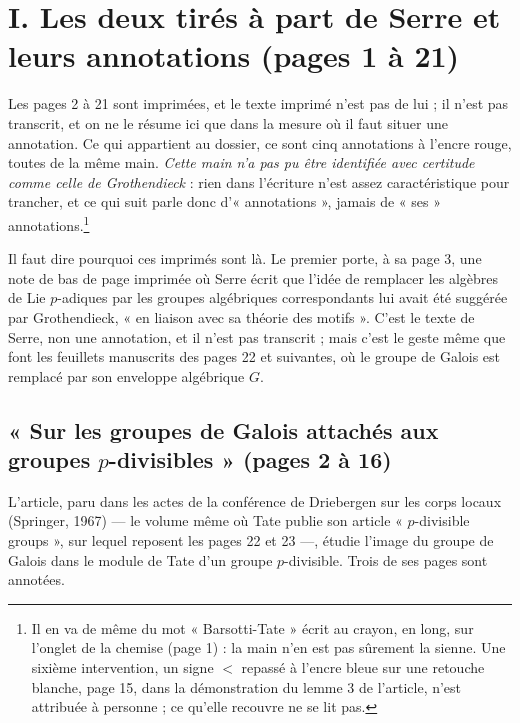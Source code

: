 \documentclass[11pt,a4paper]{article}
\begin{document}
\section*{I. Les deux tirés à part de Serre et leurs annotations (pages 1 à 21)}

Les pages 2 à 21 sont imprimées, et le texte imprimé n'est pas de lui ; il
n'est pas transcrit, et on ne le résume ici que dans la mesure où il faut
situer une annotation. Ce qui appartient au dossier, ce sont cinq annotations
à l'encre rouge, toutes de la même main. \emph{Cette main n'a pas pu être
identifiée avec certitude comme celle de Grothendieck} : rien dans l'écriture
n'est assez caractéristique pour trancher, et ce qui suit parle donc
d'« annotations », jamais de « ses » annotations.\footnote{Il en va de même du
mot « Barsotti-Tate » écrit au crayon, en long, sur l'onglet de la chemise
(page 1) : la main n'en est pas sûrement la sienne. Une sixième intervention,
un signe $<$ repassé à l'encre bleue sur une retouche blanche, page 15, dans
la démonstration du lemme 3 de l'article, n'est attribuée à personne ; ce
qu'elle recouvre ne se lit pas.}

Il faut dire pourquoi ces imprimés sont là. Le premier porte, à sa page 3, une
note de bas de page imprimée où Serre écrit que l'idée de remplacer les
algèbres de Lie $p$-adiques par les groupes algébriques correspondants lui
avait été suggérée par Grothendieck, « en liaison avec sa théorie des
motifs ». C'est le texte de Serre, non une annotation, et il n'est pas
transcrit ; mais c'est le geste même que font les feuillets manuscrits des
pages 22 et suivantes, où le groupe de Galois est remplacé par son enveloppe
algébrique $G$.

\subsection*{« Sur les groupes de Galois attachés aux groupes $p$-divisibles » (pages 2 à 16)}

L'article, paru dans les actes de la conférence de Driebergen sur les corps
locaux (Springer, 1967) --- le volume même où Tate publie son article
« $p$-divisible groups », sur lequel reposent les pages 22 et 23 ---, étudie
l'image du groupe de Galois dans le module de Tate d'un groupe $p$-divisible.
Trois de ses pages sont annotées.
\end{document}
